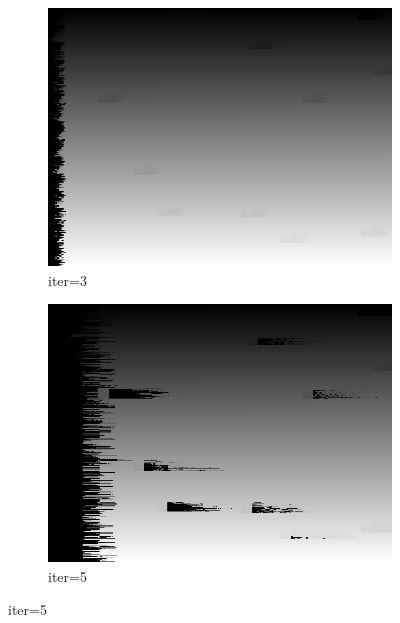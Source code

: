 \documentclass[a4paper, 11pt]{article}
\begin{document}
\begin{figure}[H]
	\centering
	\begin{subfigure}[b]{0.3\textwidth}
		\centering
		\includegraphics[width=\textwidth]{images/cuda_fl/result/3.png}
		\caption{iter=3}
	\end{subfigure}
	\hspace{5mm}
	\begin{subfigure}[b]{0.3\textwidth}
		\centering
		\includegraphics[width=\textwidth]{images/cuda_fl/result/5.png}
		\caption{iter=5}
	\end{subfigure}
	

\end{figure}
\end{document}
